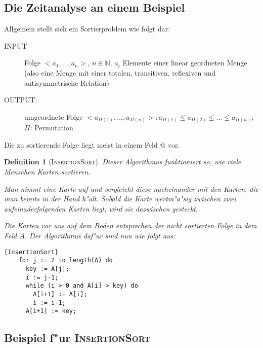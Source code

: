 \documentclass[draft,12pt]{scrreprt}
\theoremstyle{break}
\newtheorem{definition}{Definition}
\begin{document}
\subsection{Die Zeitanalyse an einem Beispiel}

Allgemein stellt sich ein Sortierproblem wie folgt dar:
\begin{description}
 \item[INPUT] Folge $<\!a_1, \ldots, a_n\!>$, $n \in \mathbb{N}$, $a_i$
  Elemente einer linear geordneten Menge (also eine Menge mit einer totalen, transitiven,
  reflexiven und antisymmetrische Relation)
 \item[OUTPUT:] umgeordnete Folge $<\!a_{\Pi(1)}, \ldots, a_{\Pi(n)}\!>:
  a_{\Pi(1)} \le a_{\Pi(2)} \le {\ldots} \le a_{\Pi(n)}$, $\Pi$:
  Permutation
\end{description} 
Die zu sortierende Folge liegt meist in einem Feld @ vor.

\begin{definition}[\textsc{InsertionSort}]
  Dieser Algorithmus funktioniert so, wie viele Menschen Karten
  sortieren.
  
  Man nimmt eine Karte auf und vergleicht diese nacheinander
  mit den Karten, die man bereits in der Hand h"alt. Sobald die Karte
  wertm"a"sig zwischen zwei aufeinaderfolgenden Karten liegt, wird sie
  dazwischen gesteckt.
  
  Die Karten vor uns auf dem Boden entsprechen der nicht sortierten Folge
  in dem Feld $A$. Der Algorithmus daf"ur sind nun wie folgt aus:
  \begin{Algorithmus}[h]
    \begin{lstlisting}[frame=tlrb, mathescape=true, title=\textsc{InsertionSort}, gobble=4]{InsertionSort}
    for j := 2 to length(A) do
      key := A[j];
      i := j-1;
      while (i > 0 and A[i] > key) do
        A[i+1] := A[i];
        i := i-1;
      A[i+1] := key;
    \end{lstlisting}
  \end{Algorithmus}
\end{definition}

\subsection{Beispiel f"ur \textsc{InsertionSort}}
\end{document}
